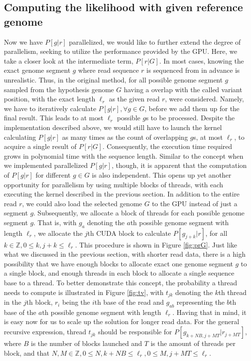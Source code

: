 \documentclass{PHlab-thesis}
\begin{document}
\subsection{Computing the likelihood with given reference genome}
Now we have $P[g|r]$ parallelized, we would like to further extend the degree of parallelism, seeking to utilize the performance provided by the GPU. Here, we take a closer look at the intermediate term, $P[r|G]$. In most cases, knowing the exact genome segment $g$ where read sequence $r$ is sequenced from in advance is unrealistic. Thus, in the original method, for all possible genome segment $g$ sampled from the hypothesis genome $G$ having a overlap with the called variant position, with the exact length ${\ell_r}$ as the given read $r$, were considered. Namely, we have to iteratively calculate $P[g|r], \forall g \in G$, before we add them up for the final result. This leads to at most ${\ell_r}$ possible $g$s to be processed. Despite the implementation described above, we would still have to launch the kernel calculating $P[g|r]$ as many times as the count of overlapping $g$s, at most ${\ell_r}$, to acquire a single result of $P[r|G]$.  Consequently, the execution time required grows in polynomial time with the sequence length. Similar to the concept when we implemented parallelized $P[g|r]$, though, it is apparent that the computation of $P[g|r]$ for different $g \in G$ is also independent. This opens up yet another opportunity for parallelism by using multiple blocks of threads, with each executing the kernel described in the previous section. In addition to the entire read $r$, we could also load the selected genome $G$ to the GPU instead of just a segment $g$. Subsequently, we allocate a block of threads for each possible genome segment $g$. 
That is, with $g_a$ denoting the $a$th possible genome segment with length ${\ell_r}$, we allocate the $j$th CUDA block to calculate $P[g_{j+k}|r]$, for all $k \in \mathbb{Z} ,0 \leq k, j+k \leq {\ell_r}$.  This procedure is shown in Figure \ref{fig:prG}. Just like what we discussed in the previous section, with shorter read data, there is a high possibility that we have enough blocks to allocate exact one genome segment $g$ to a single block, and enough threads in each block to allocate a single sequence base to a thread. To better demonstrate this concept, the probability a thread needs to compute is illustrated in Figure \ref{fig:tv}, with $t_{jk}$ denoting the $k$th thread in the $j$th block, $r_i$ being the $i$th base of the read and $g_{ab}$ representing the $b$th base of the $a$th possible genome segment with length ${\ell_r}$. Having that in mind, it is easy now for us to scale up the solution for longer read data. For the general recursive expression, thread $t_{jk}$ should be responsible for $P[g_{k+NB,j+MT}|r_{j+MT}]$, where $B$ is the number of blocks launched and $T$ is the amount of threads per block, and that $N, M \in \mathbb{Z} ,0 \leq N, k+NB \leq {\ell_r}, 0 \leq M, j+MT \leq {\ell_r}$.
\end{document}
